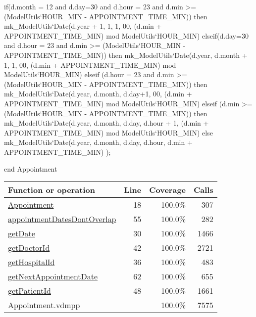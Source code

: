 \begin{vdmpp}[breaklines=true]
  if(d.month = 12 and d.day=30 and d.hour = 23 and d.min >= (ModelUtils`HOUR_MIN - APPOINTMENT_TIME_MIN)) then
   mk_ModelUtils`Date(d.year + 1, 1, 1, 00, (d.min + APPOINTMENT_TIME_MIN) mod ModelUtils`HOUR_MIN)
  elseif(d.day=30 and d.hour = 23 and d.min >= (ModelUtils`HOUR_MIN - APPOINTMENT_TIME_MIN)) then
   mk_ModelUtils`Date(d.year, d.month + 1, 1, 00, (d.min + APPOINTMENT_TIME_MIN) mod ModelUtils`HOUR_MIN)
  elseif (d.hour = 23 and d.min >= (ModelUtils`HOUR_MIN - APPOINTMENT_TIME_MIN)) then
   mk_ModelUtils`Date(d.year, d.month, d.day+1, 00, (d.min + APPOINTMENT_TIME_MIN) mod ModelUtils`HOUR_MIN)
  elseif (d.min >= (ModelUtils`HOUR_MIN - APPOINTMENT_TIME_MIN)) then
   mk_ModelUtils`Date(d.year, d.month, d.day, d.hour + 1, (d.min + APPOINTMENT_TIME_MIN) mod ModelUtils`HOUR_MIN)
  else
   mk_ModelUtils`Date(d.year, d.month, d.day, d.hour, d.min + APPOINTMENT_TIME_MIN)
 );
 
 
end Appointment
\end{vdmpp}
\bigskip
\begin{longtable}{|l|r|r|r|}
\hline
Function or operation & Line & Coverage & Calls \\
\hline
\hline
\hyperref[Appointment:18]{Appointment} & 18&100.0\% & 307 \\
\hline
\hyperref[appointmentDatesDontOverlap:55]{appointmentDatesDontOverlap} & 55&100.0\% & 282 \\
\hline
\hyperref[getDate:30]{getDate} & 30&100.0\% & 1466 \\
\hline
\hyperref[getDoctorId:42]{getDoctorId} & 42&100.0\% & 2721 \\
\hline
\hyperref[getHospitalId:36]{getHospitalId} & 36&100.0\% & 483 \\
\hline
\hyperref[getNextAppointmentDate:62]{getNextAppointmentDate} & 62&100.0\% & 655 \\
\hline
\hyperref[getPatientId:48]{getPatientId} & 48&100.0\% & 1661 \\
\hline
\hline
Appointment.vdmpp & & 100.0\% & 7575 \\
\hline
\end{longtable}

